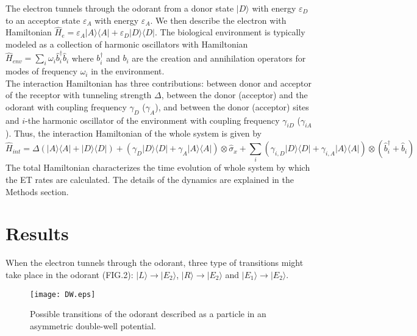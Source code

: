 \documentclass[aps,prl,tightenlines,onecolumn,superscriptaddress]{revtex4}
\begin{document}
\indent The electron tunnels through the odorant from a donor state $|D\rangle$ with energy $\varepsilon_{D}$ to an acceptor state $\varepsilon_{A}$ with energy $\varepsilon_{A}$. We then describe the electron with Hamiltonian $\hat{H}_{e}=\varepsilon_{A}|A\rangle\langle A|+\varepsilon_{D}|D\rangle\langle D|$. The biological environment is typically modeled as a collection of harmonic oscillators with Hamiltonian
$\hat{H}_{env}=\sum_{i}\omega_{i}\hat b_{i}^{\dag}\hat b_{i}$ where $b_{i}^{\dag}$ and $b_{i}$ are the creation and annihilation operators for modes of frequency $\omega_{i}$ in the environment.\\
\indent The interaction Hamiltonian has three contributions: between donor and acceptor of the receptor with tunneling strength $\Delta$, between the donor (acceptor) and the odorant with coupling frequency $\gamma_{D}$ ($\gamma_{A}$), and between the donor (acceptor) sites and $i$-the harmonic oscillator of the environment with coupling frequency $\gamma_{iD}$ ($\gamma_{iA}$). Thus, the interaction Hamiltonian of the whole system is given by~\cite{Bro}
\begin{equation}\label{int}
\hat{H}_{int}=\Delta(|A\rangle\langle A|+|D\rangle\langle D|)+(\gamma_{D}|D\rangle\langle D| +\gamma_{A}|A\rangle\langle A|)\otimes\hat{\sigma}_{x}+\sum_{i}(\gamma_{i,D}|D\rangle\langle D|+\gamma_{i,A}|A\rangle\langle A|)\otimes(\hat b_{i}^{\dag}+\hat b_{i})
\end{equation}
The total Hamiltonian characterizes the time evolution of whole system by which the ET rates are calculated. The details of the dynamics are explained in the Methods section.
\section{Results}
 When the electron tunnels through the odorant, three type of transitions might take place in the odorant (FIG.2): $|L\rangle\rightarrow|E_{2}\rangle$, $|R\rangle\rightarrow|E_{2}\rangle$ and $|E_{1}\rangle\longrightarrow|E_{2}\rangle$.

\begin{figure}[H]
\texttt{[image: DW.eps]}\centering
\caption{Possible transitions of the odorant described as a particle in an asymmetric double-well potential.}
\end{figure}
\end{document}
